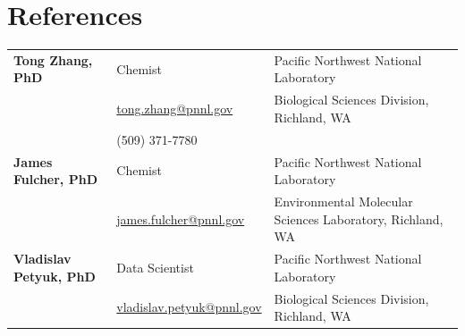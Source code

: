 \documentclass[10pt, letterpaper]{article}
\begin{document}
\section{References}

\begin{tabular}{@{}lll@{}}
\textbf{Tong Zhang, PhD} & Chemist & Pacific Northwest National Laboratory \\
& \href{mailto:tong.zhang@pnnl.gov}{tong.zhang@pnnl.gov} & Biological Sciences Division, Richland, WA \\
& (509) 371-7780 & \\[8pt]
\textbf{James Fulcher, PhD} & Chemist & Pacific Northwest National Laboratory \\
& \href{mailto:james.fulcher@pnnl.gov}{james.fulcher@pnnl.gov} & Environmental Molecular Sciences Laboratory, Richland, WA \\[8pt]
\textbf{Vladislav Petyuk, PhD} & Data Scientist & Pacific Northwest National Laboratory \\
& \href{mailto:vladislav.petyuk@pnnl.gov}{vladislav.petyuk@pnnl.gov} & Biological Sciences Division, Richland, WA \\
\end{tabular}
\end{document}
